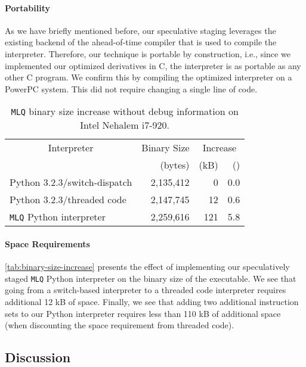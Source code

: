 \documentclass[preprint,10pt]{popl14conf}
\newcommand{\mlq}{\texttt{MLQ}}
\begin{document}
\paragraph{Portability}
As we have briefly mentioned before, our speculative staging leverages the existing backend of the
ahead-of-time compiler that is used to compile the interpreter.
Therefore, our technique is portable by construction, i.e., since we implemented our optimized
derivatives in C, the interpreter is as portable as any other C program.
We confirm this by compiling the optimized interpreter on a PowerPC system.
This did not require changing a single line of code.

\begin{table}[t!]
  \centering
    \begin{tabular}{|l|r|r|r|}
      \hline
      \multicolumn{1}{|c|}{Interpreter} & Binary Size & \multicolumn{2}{c|}{Increase} \\
      \cline{3-4}
      & (bytes)     & (kB) & ()                 \\
      \hline
      \hline
      Python 3.2.3/switch-dispatch      & 2,135,412   & 0    & 0.0                    \\
      Python 3.2.3/threaded code        & 2,147,745   & 12   & 0.6                    \\
      \mlq{} Python interpreter         & 2,259,616   & 121  & 5.8                    \\
      \hline
    \end{tabular}
    \caption{\mlq{} binary size increase without debug information on Intel Nehalem i7-920.\label{tab:binary-size-increase}}
\end{table}

\paragraph{Space Requirements}\autoref{tab:binary-size-increase} presents the effect of implementing
our speculatively staged \mlq{} Python interpreter on the binary size of the executable.
We see that going from a switch-based interpreter to a threaded code interpreter requires additional
12 kB of space.
Finally, we see that adding two additional instruction sets to our Python interpreter requires less
than 110 kB of additional space (when discounting the space requirement from threaded code).


\subsection{Discussion}\label{ss:discussion}
\end{document}
